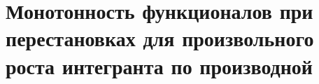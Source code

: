 \chapter{Монотонность функционалов при перестановках для произвольного роста интегранта по производной}
\label{chapt2}


